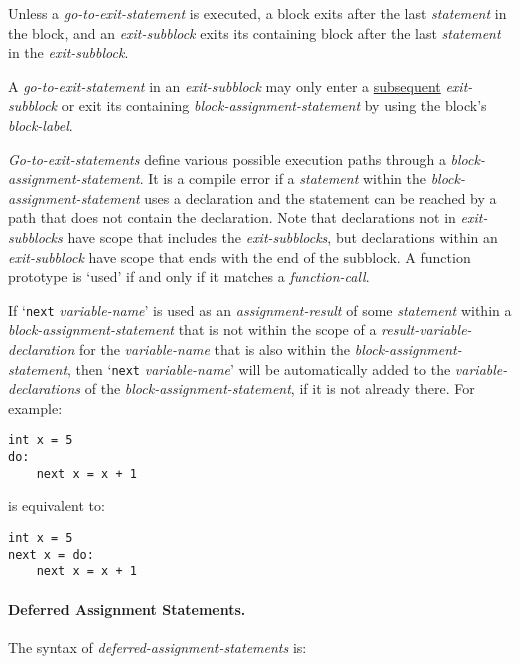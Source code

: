 \documentclass[12pt]{article}
\newcommand{\subsubsubsection}[1]{\paragraph[#1]{#1.}}
\newenvironment{indpar}[1][0.3in]%
	{\begin{list}{}%
		     {\setlength{\itemsep}{0in}%
		      \setlength{\topsep}{0in}%
		      \setlength{\parsep}{1ex}%
		      \setlength{\labelwidth}{#1}%
		      \setlength{\leftmargin}{#1}%
		      \addtolength{\leftmargin}{\labelsep}}%
	 \item}%
	{\end{list}}
\begin{document}
Unless a {\em go-to-exit-statement} is executed,
a block exits after the last {\em statement} in the block,
and an {\em exit-subblock} exits its containing block after the last
{\em statement} in the {\em exit-subblock}.

A {\em go-to-exit-statement} in an {\em exit-subblock} may only enter
a \underline{subsequent} {\em exit-subblock} or exit its containing
{\em block-assignment-statement} by using the block's {\em block-label}.

{\em Go-to-exit-statements} define various possible execution
paths through a {\em block-assignment-statement}.
It is a compile error if a {\em statement}
within the {\em block-assignment-statement}
uses a declaration and the statement can be reached by a path that
does not contain the declaration.
Note that declarations not in {\em exit-subblocks} have scope
that includes the {\em exit-subblocks}, but declarations
within an {\em exit-subblock} have scope that ends with the end of
the subblock.  A function prototype is `used' if and only if it
matches a {\em function-call}.

If\label{NEXT-PROMOTION} `{\tt next} {\em variable-name}' is used as an
{\em assignment-result} of some {\em statement} within a
{\em block-assignment-statement} that is not within the scope of
a {\em result-variable-declaration} for the {\em variable-name}
that is also within the {\em block-assignment-statement},
then `{\tt next} {\em variable-name}' will be automatically added
to the {\em variable-declarations} of the {\em block-assignment-statement},
if it is not already there.  For example:
\begin{indpar}\begin{verbatim}
int x = 5
do:
    next x = x + 1
\end{verbatim}\end{indpar}
is equivalent to:
\begin{indpar}\begin{verbatim}
int x = 5
next x = do:
    next x = x + 1
\end{verbatim}\end{indpar}

\subsubsubsection{Deferred Assignment Statements}
\label{DEFERRED-ASSIGNMENT-STATEMENTS}

The syntax of {\em deferred-assignment-state\-ments} is:
\end{document}
